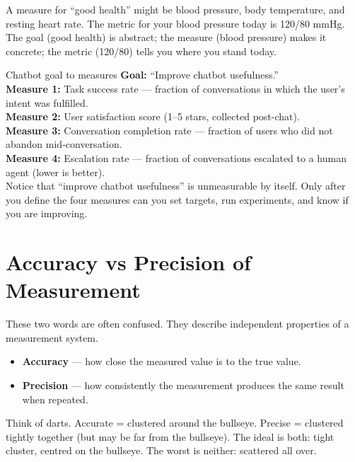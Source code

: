 \documentclass[a4paper,11pt]{article}
\newcommand{\vocab}[1]{\textbf{\color{navy}#1}}
\begin{document}
\begin{everyday}
A measure for ``good health'' might be blood pressure, body temperature, and resting heart rate. The metric for your blood pressure today is 120/80 mmHg. The goal (good health) is abstract; the measure (blood pressure) makes it concrete; the metric (120/80) tells you where you stand today.
\end{everyday}

\begin{worked}{Chatbot goal to measures}
\textbf{Goal:} ``Improve chatbot usefulness.'' \\[4pt]
\textbf{Measure 1:} Task success rate --- fraction of conversations in which the user's intent was fulfilled. \\
\textbf{Measure 2:} User satisfaction score (1--5 stars, collected post-chat). \\
\textbf{Measure 3:} Conversation completion rate --- fraction of users who did not abandon mid-conversation. \\
\textbf{Measure 4:} Escalation rate --- fraction of conversations escalated to a human agent (lower is better). \\[4pt]
Notice that ``improve chatbot usefulness'' is unmeasurable by itself. Only after you define the four measures can you set targets, run experiments, and know if you are improving.
\end{worked}

\section{Accuracy vs Precision of Measurement}

These two words are often confused. They describe independent properties of a measurement system.

\begin{itemize}
  \item \vocab{Accuracy} --- how close the measured value is to the true value.
  \item \vocab{Precision} --- how consistently the measurement produces the same result when repeated.
\end{itemize}

\begin{intuition}
Think of darts. Accurate = clustered around the bullseye. Precise = clustered tightly together (but may be far from the bullseye). The ideal is both: tight cluster, centred on the bullseye. The worst is neither: scattered all over.
\end{intuition}
\end{document}
